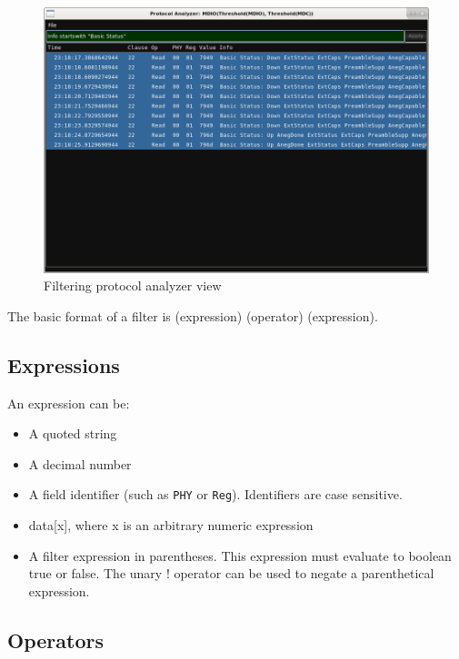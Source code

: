 \begin{figure}[H]
\centering
\includegraphics[width=14cm]{images/proto-filter.png}
\caption{Filtering protocol analyzer view}
\label{proto-filter}
\end{figure}

The basic format of a filter is (expression) (operator) (expression).

\subsection{Expressions}

An expression can be:
\begin{itemize}
\item A quoted string
\item A decimal number
\item A field identifier (such as \texttt{PHY} or \texttt{Reg}). Identifiers are case sensitive.
\item data[x], where x is an arbitrary numeric expression
\item A filter expression in parentheses. This expression must evaluate to boolean true or false. The unary ! operator
can be used to negate a parenthetical expression.
\end{itemize}

\subsection{Operators}

